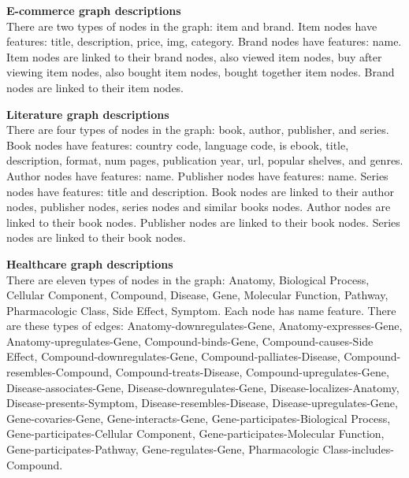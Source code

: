 \documentclass[11pt,UTF8,fontset=fandol]{ctexart}
\newenvironment{promptbox}{%
  \par\noindent\begin{minipage}{\linewidth}\centering
  \begin{minipage}{0.95\linewidth}\small\itshape
}{%
  \end{minipage}\end{minipage}\par\medskip
}
\begin{document}
\begin{promptbox}
\textbf{E-commerce graph descriptions}\\[4pt]
\normalfont There are two types of nodes in the graph: item and brand. Item nodes have features: title, description, price, img, category. Brand nodes have features: name. Item nodes are linked to their brand nodes, also viewed item nodes, buy after viewing item nodes, also bought item nodes, bought together item nodes. Brand nodes are linked to their item nodes.
\end{promptbox}

\begin{promptbox}
\textbf{Literature graph descriptions}\\[4pt]
\normalfont There are four types of nodes in the graph: book, author, publisher, and series. Book nodes have features: country code, language code, is ebook, title, description, format, num pages, publication year, url, popular shelves, and genres. Author nodes have features: name. Publisher nodes have features: name. Series nodes have features: title and description. Book nodes are linked to their author nodes, publisher nodes, series nodes and similar books nodes. Author nodes are linked to their book nodes. Publisher nodes are linked to their book nodes. Series nodes are linked to their book nodes.
\end{promptbox}

\begin{promptbox}
\textbf{Healthcare graph descriptions}\\[4pt]
\normalfont There are eleven types of nodes in the graph: Anatomy, Biological Process, Cellular Component, Compound, Disease, Gene, Molecular Function, Pathway, Pharmacologic Class, Side Effect, Symptom. Each node has name feature. There are these types of edges: Anatomy-downregulates-Gene, Anatomy-expresses-Gene, Anatomy-upregulates-Gene, Compound-binds-Gene, Compound-causes-Side Effect, Compound-downregulates-Gene, Compound-palliates-Disease, Compound-resembles-Compound, Compound-treats-Disease, Compound-upregulates-Gene, Disease-associates-Gene, Disease-downregulates-Gene, Disease-localizes-Anatomy, Disease-presents-Symptom, Disease-resembles-Disease, Disease-upregulates-Gene, Gene-covaries-Gene, Gene-interacts-Gene, Gene-participates-Biological Process, Gene-participates-Cellular Component, Gene-participates-Molecular Function, Gene-participates-Pathway, Gene-regulates-Gene, Pharmacologic Class-includes-Compound.
\end{promptbox}
\end{document}
